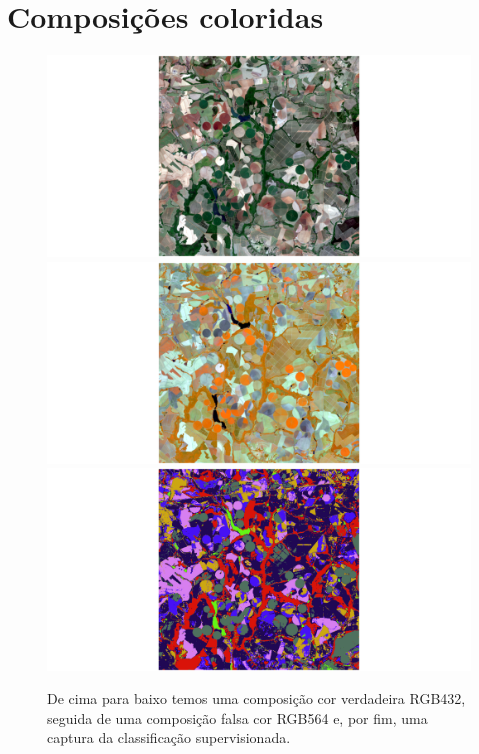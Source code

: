 \documentclass[a4paper]{article}
\begin{document}
	\section{Composições coloridas}
	\begin{figure}[H]
		\centering
		\includegraphics[width=1.\linewidth]{../images/rgb432}
		\includegraphics[width=1.\linewidth]{../images/rgb564}
		\includegraphics[width=1.\linewidth]{../images/classification}
		\caption{De cima para baixo temos uma composição cor verdadeira RGB432, seguida de uma composição falsa cor RGB564 e, por fim, uma captura da classificação supervisionada.}
	\end{figure}
\end{document}
